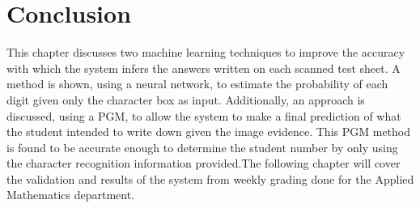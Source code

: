 \section{Conclusion}
This chapter discusses two machine learning techniques to improve the accuracy with which the system infers the answers written on each scanned test sheet. A method is shown, using a neural network, to estimate the probability of each digit given only the character box as input. Additionally, an approach is discussed, using a PGM, to allow the system to make a final prediction of what the student intended to write down given the image evidence. This PGM method is found to be accurate enough to determine the student number by only using the character recognition information provided.The following chapter will cover the validation and results of the system from weekly grading done for the Applied Mathematics department.
